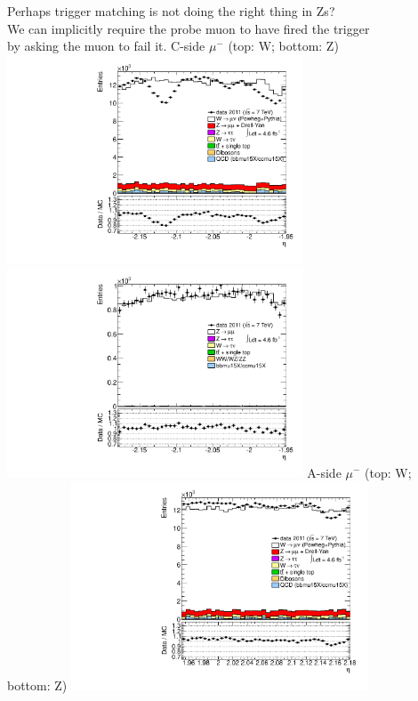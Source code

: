  {
   Perhaps trigger matching is not doing the right thing in Zs? \\
   We can implicitly require the probe muon to have fired the trigger \\
   by asking the  muon to fail it.
}
 {
\colb[T]
C-side $\mu^{-}$ (top: W; bottom: Z)
\centering
\includegraphics[width=0.66\textwidth]{dates/20130306/figures/both/W_10_C_stack_l_eta_POS} \\
\includegraphics[width=0.66\textwidth]{dates/20130306/figures/both/Z_10_C_stack_lP_eta_ALL.pdf}
A-side $\mu^{-}$ (top: W; bottom: Z)
\centering
\includegraphics[width=0.66\textwidth]{dates/20130306/figures/both/W_10_A_stack_l_eta_POS} \\
}
